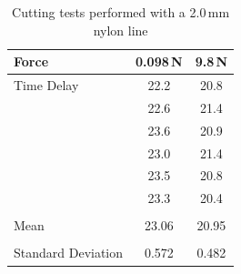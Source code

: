 \begin{table}[h]
    \centering
    \begin{tabular}{ m{4cm} | m{1.5cm} | m{1.5cm} } 
      \hline
      Force                 & \multicolumn{1}{c}{0.098\,N} & \multicolumn{1}{|c}{9.8\,N}  \\ \hline
      Time Delay            & \multicolumn{1}{c}{22.2}    & \multicolumn{1}{|c}{20.8}       \\
                            & \multicolumn{1}{c}{22.6}    & \multicolumn{1}{|c}{21.4}       \\
                            & \multicolumn{1}{c}{23.6}    & \multicolumn{1}{|c}{20.9}       \\
                            & \multicolumn{1}{c}{23.0}    & \multicolumn{1}{|c}{21.4}       \\
                            & \multicolumn{1}{c}{23.5}    & \multicolumn{1}{|c}{20.8}       \\
                            & \multicolumn{1}{c}{23.3}    & \multicolumn{1}{|c}{20.4}       \\
                            & \multicolumn{1}{c}{}        &  \multicolumn{1}{|c}{}          \\
      Mean                  & \multicolumn{1}{c}{23.06}   &\multicolumn{1}{|c}{20.95}      \\
                            & \multicolumn{1}{c}{}        &  \multicolumn{1}{|c}{}          \\
      Standard Deviation    & \multicolumn{1}{c}{0.572}   &\multicolumn{1}{|c}{0.482}      \\
    \end{tabular}
    \caption{\label{tab:nylon-2}Cutting tests performed with a 2.0\,mm nylon line}
\end{table}

